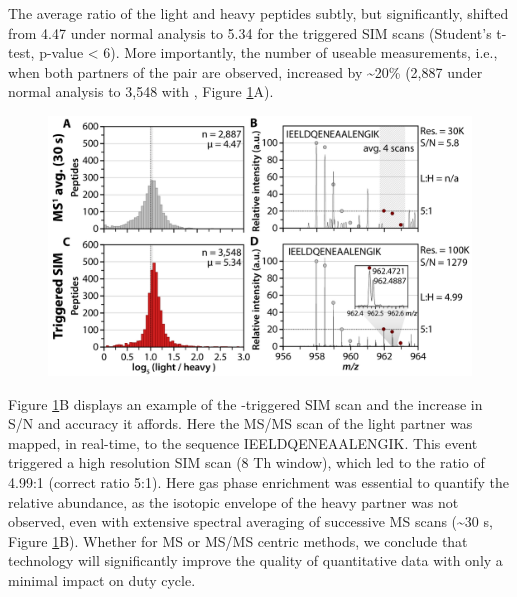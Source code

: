 The average ratio of the light and heavy peptides subtly, but significantly, shifted from 4.47 under normal analysis to 5.34 for the \inseq{} triggered SIM scans (Student's t-test, p-value < 6). More importantly, the number of useable measurements, i.e., when both partners of the pair are observed, increased by \textasciitilde20\% (2,887 under normal analysis to 3,548 with \inseq{}, Figure \ref{fig:inseqs5}A).
\begin{figure}
	\centering
	\includegraphics[width=\columnwidth]{inseq/inSeq_Fig S5.png}
	\label{fig:inseqs5}
\end{figure}
Figure \ref{fig:inseqs5}B displays an example of the \inseq{}-triggered SIM scan and the increase in S/N and accuracy it affords. Here the MS/MS scan of the light partner was mapped, in real-time, to the sequence IEELDQENEAALENGIK. This event triggered a high resolution SIM scan (8 Th window), which led to the ratio of 4.99:1 (correct ratio 5:1). Here gas phase enrichment was essential to quantify the relative abundance, as the isotopic envelope of the heavy partner was not observed, even with extensive spectral averaging of successive MS scans (\textasciitilde30 s, Figure \ref{fig:inseqs5}B). Whether for MS or MS/MS centric methods, we conclude that \inseq{} technology will significantly improve the quality of quantitative data with only a minimal impact on duty cycle.

